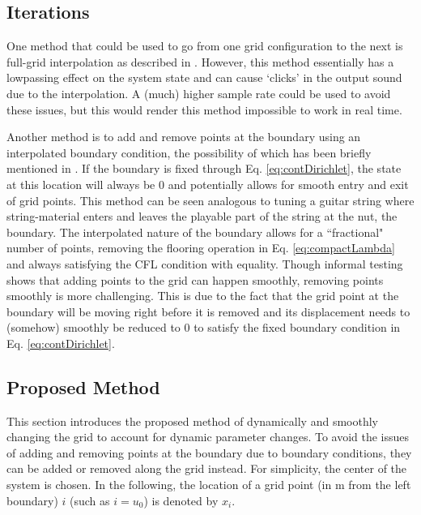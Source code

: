 \documentclass[dvipsnames, reprint]{JASA}
\def\SWcomment[#1]{\textcolor{Bittersweet}{#1}}
\begin{document}
\subsection{Iterations}\label{sec:iterations}
One method that could be used to go from one grid configuration to the next is full-grid interpolation as described in \cite[Chap. 5]{bilbao2009}. However, this method essentially has a lowpassing effect on the system state and can cause `clicks' in the output sound due to the interpolation. A (much) higher sample rate could be used to avoid these issues, but this would render this method impossible to work in real time.

Another method is to add and remove points at the boundary using an interpolated boundary condition, the possibility of which has been briefly mentioned in \cite[p. 145]{bilbao2009}. If the boundary is fixed through Eq. \eqref{eq:contDirichlet}, the state at this location will always be $0$ and potentially allows for smooth entry and exit of grid points. This method can be seen analogous to tuning a guitar string where string-material enters and leaves the playable part of the string at the nut, the boundary. The interpolated nature of the boundary allows for a ``fractional" number of points, removing the flooring operation in Eq. \eqref{eq:compactLambda} and always satisfying the CFL condition with equality. Though informal testing shows that adding points to the grid can happen smoothly, removing points smoothly is more challenging. This is due to the fact that the grid point at the boundary will be moving right before it is removed and its displacement needs to (somehow) smoothly be reduced to 0 to satisfy the fixed boundary condition in Eq. \eqref{eq:contDirichlet}. %

\subsection{Proposed Method}
This section introduces the proposed method of dynamically and smoothly changing the grid to account for dynamic parameter changes. To avoid the issues of adding and removing points at the boundary due to boundary conditions, they can be added or removed along the grid instead. For simplicity, the center of the system is chosen. In the following, the location of a grid point (in m from the left boundary) $i$ (such as $i = u_0$) is denoted by $x_i$. 
\end{document}
